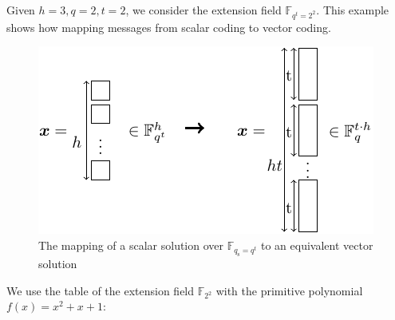 \begin{example}
\label{ex:scalar_vector_mapping} 

Given $h=3,q=2,t=2$, we consider the extension field $\ensuremath{\mathbb{F}}_{q^{t}=2^{2}}$.
This example shows how mapping messages from scalar coding to vector
coding.
\begin{figure}[H]
\caption{The mapping of a scalar solution over $\ensuremath{\mathbb{F}}_{q_{\mathrm{s}}=q^{t}}$
to an equivalent vector solution\label{fig:x_mapping}}

\centering{}\includegraphics[width=0.3\paperwidth]{./figures/x_mapping}
\end{figure}
\end{example}
We use the table of the extension field $\ensuremath{\mathbb{F}}_{2^{2}}$
with the primitive polynomial $f(x)=x^{2}+x+1$:
